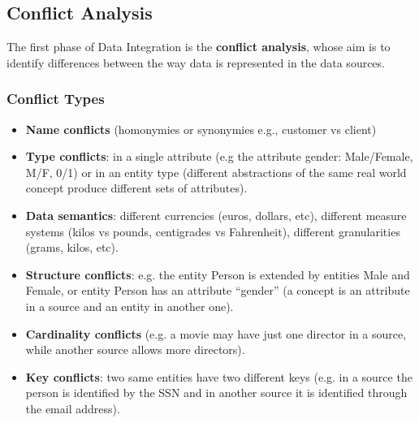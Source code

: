 \documentclass[10pt,a4paper]{article}
\begin{document}
\subsection{Conflict Analysis}
\begin{justify}
The first phase of Data Integration is the \textbf{conflict analysis}, whose aim is to identify differences between the way data is represented in the data sources.   
\subsubsection{Conflict Types}
\begin{itemize}
	\item \textbf{Name conflicts} (homonymies or synonymies e.g., customer vs client)
	\item \textbf{Type conflicts}: in a single attribute (e.g the attribute gender: Male/Female, M/F, 0/1) or in an entity type (different abstractions of the same real world concept produce different sets of attributes).
	\item \textbf{Data semantics}: different currencies (euros, dollars, etc), different measure systems (kilos vs pounds, centigrades vs Fahrenheit), different granularities (grams, kilos, etc).
	\item \textbf{Structure conflicts}: e.g. the entity Person is extended by entities Male and Female, or entity Person has an attribute “gender” (a concept is an attribute in a source and an entity in another one).
	\item \textbf{Cardinality conflicts} (e.g. a movie may have just one director in a source, while another source allows more directors).
	\item \textbf{Key conflicts}: two same entities have two different keys (e.g. in a source the person is identified by the SSN and in another source it is identified through the email address).
\end{itemize}
\end{justify}
\end{document}
